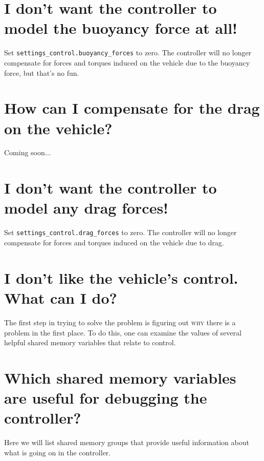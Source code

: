 \documentclass[11pt]{article}
\newcommand{\question}[1] %
{
  \section{#1}
}
\begin{document}
\question{I don't want the controller to model the buoyancy force at all!}

    Set \texttt{settings\_control.buoyancy\_forces} to zero. The controller will no longer compensate for forces and torques induced on the vehicle due to the buoyancy force, but that's no fun.\\

\question{How can I compensate for the drag on the vehicle?}

    Coming soon...\\

\question{I don't want the controller to model any drag forces!}

    Set \texttt{settings\_control.drag\_forces} to zero. The controller will no longer compensate for forces and torques induced on the vehicle due to drag.\\

\question{I don't like the vehicle's control. What can I do?}

The first step in trying to solve the problem is figuring out \textsc{why} there is a problem in the first place. To do this, one can examine the values of several helpful shared memory variables that relate to control.\\

\question{Which shared memory variables are useful for debugging the controller?}

    Here we will list shared memory groups that provide useful information about what is going on in the controller.
\end{document}
